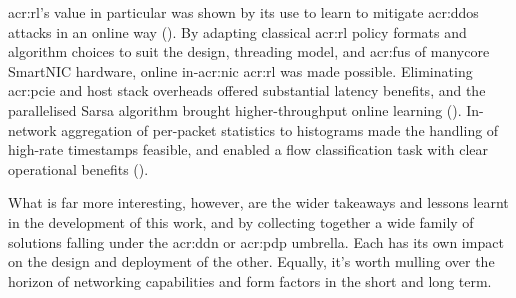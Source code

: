 \gls{acr:rl}'s value in particular was shown by its use to learn to mitigate \gls{acr:ddos} attacks in an online way ().
By adapting classical \gls{acr:rl} policy formats and algorithm choices to suit the design, threading model, and \glspl{acr:fu} of manycore SmartNIC hardware, online in-\gls{acr:nic} \gls{acr:rl} was made possible.
Eliminating \gls{acr:pcie} and host stack overheads offered substantial latency benefits, and the parallelised Sarsa algorithm brought higher-throughput online learning ().
In-network aggregation of per-packet statistics to histograms made the handling of high-rate timestamps feasible, and enabled a flow classification task with clear operational benefits ().

What is far more interesting, however, are the wider takeaways and lessons learnt in the development of this work, and by collecting together a wide family of solutions falling under the \gls{acr:ddn} or \gls{acr:pdp} umbrella.
Each has its own impact on the design and deployment of the other.
Equally, it's worth mulling over the horizon of networking capabilities and form factors in the short and long term.

